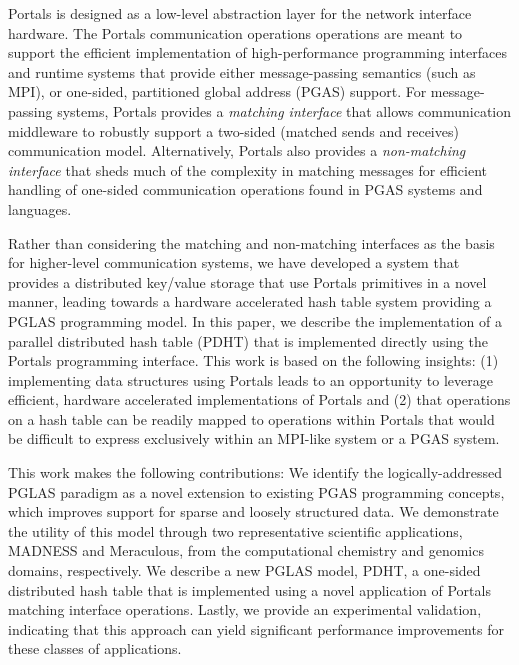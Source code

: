 Portals is designed as a low-level abstraction layer for the network interface
hardware. The Portals communication operations operations are
meant to support the efficient implementation of high-performance programming
interfaces and runtime systems that provide either message-passing semantics
(such as MPI), or one-sided, partitioned global address (PGAS) support. For
message-passing systems, Portals provides a {\em matching interface} that
allows communication middleware to robustly support a two-sided (matched sends
and receives) communication model. Alternatively, Portals also provides a {\em
non-matching interface} that sheds much of the complexity in matching messages
for efficient handling of one-sided communication operations found in PGAS
systems and languages.

Rather than considering the matching and non-matching interfaces as
the basis for higher-level communication systems, we have developed a
system that provides a distributed key/value storage that use Portals
primitives in a novel manner, leading towards a hardware accelerated
hash table system providing a PGLAS programming model. In this paper, we describe the implementation of a
parallel distributed hash table (PDHT) that is implemented directly
using the Portals programming interface. This work is based on the
following insights: (1) implementing data structures using Portals
leads to an opportunity to leverage efficient, hardware accelerated
implementations of Portals and (2) that operations on a hash table
can be readily mapped to operations within
Portals that would be difficult to express exclusively within an
MPI-like system or a PGAS system.

This work makes the following contributions: We identify the
logically-addressed PGLAS paradigm as a novel extension to existing PGAS
programming concepts, which improves support for sparse and loosely structured
data.  We demonstrate the utility of this model through two representative
scientific applications, MADNESS and Meraculous, from the computational
chemistry and genomics domains, respectively.  We describe a new PGLAS model,
PDHT, a one-sided distributed hash table that is implemented using a novel
application of Portals matching interface operations. Lastly, we provide an
experimental validation, indicating that this approach can yield significant
performance improvements for these classes of applications.




